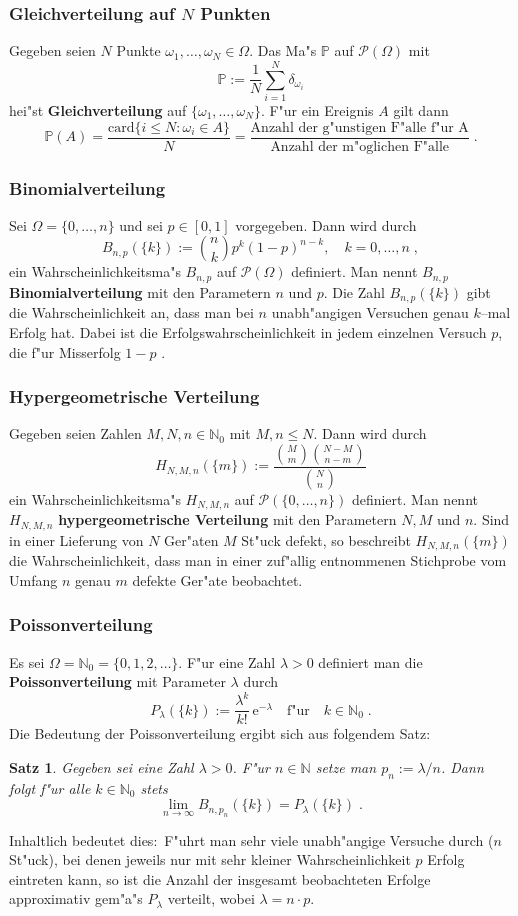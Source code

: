 \documentclass[ngerman,draft,parskip=half,twoside]{scrartcl}
\newtheorem{thm}{Satz}[section]
\newcommand*{\N}{\mathbb{N}}      %
\newcommand*{\PotM}{\mathcal{P}}    %
\newcommand*{\WKM}{\mathbb{P}}      %
\begin{document}
\subsubsection{Gleichverteilung auf $N$ Punkten}
Gegeben seien $N$ Punkte $\omega_1,\ldots,\omega_N\in\Omega$.
Das Ma"s $\WKM$ auf $\PotM(\Omega)$ mit
$$
\WKM:=\frac{1}{N}\sum_{i=1}^N \delta_{\omega_i}
$$
hei"st \textbf{Gleichverteilung} auf $\{\omega_1,\ldots,\omega_N\}$. F"ur ein Ereignis $A$ gilt dann
$$
\WKM(A)=\frac{\mathrm{card}\{ i\le N : \omega_i\in A\}}{N}=
\frac{\mbox{Anzahl der g"unstigen F"alle f"ur A}}{\mbox{Anzahl der m"oglichen F"alle}}\;.
$$
\subsubsection{Binomialverteilung}
Sei $\Omega=\{0,\ldots,n\}$ und sei $p\in[0,1]$ vorgegeben. Dann wird durch
$$
B_{n,p}(\{k\}):={n\choose k} p^k(1-p)^{n-k},\quad k=0,\ldots,n\;,
$$
ein Wahrscheinlichkeitsma"s $B_{n,p}$ auf $\PotM(\Omega)$ definiert. Man nennt $B_{n,p}$
\textbf{Binomialverteilung} mit den Parametern $n$ und $p$. Die Zahl
$B_{n,p}(\{k\})$ gibt die Wahrscheinlichkeit an, dass man bei $n$ unabh"angigen Versuchen genau $k$--mal
Erfolg hat. Dabei ist die Erfolgswahrscheinlichkeit in jedem einzelnen Versuch $p$, die f"ur
Misserfolg $1-p$ .
\subsubsection{Hypergeometrische Verteilung}
Gegeben seien Zahlen $M,N,n\in\N_0$ mit $M,n\le N$. Dann wird durch
$$
H_{N, M ,n}(\{m\}) :=\frac{{M\choose m}{N-M\choose n-m}}{{N\choose n}}
$$
ein Wahrscheinlichkeitsma"s $H_{N,M,n}$ auf $\PotM(\{0,\ldots,n\})$
definiert. Man nennt $H_{N,M,n}$  \textbf{hypergeometrische Verteilung} mit den Parametern $N,M$ und $n$.
Sind in einer Lieferung von $N$ Ger"aten $M$ St"uck defekt, so beschreibt $H_{N,M,n}(\{m\})$
die Wahrscheinlichkeit, dass man in einer zuf"allig entnommenen Stichprobe vom Umfang $n$ genau
$m$ defekte Ger"ate beobachtet.
\subsubsection{Poissonverteilung}
Es sei $\Omega=\N_0=\{0,1,2,\ldots\}$. F"ur eine Zahl $\lambda>0$ definiert
man die \textbf{Poissonverteilung} mit Parameter $\lambda$ durch
$$
P_\lambda(\{k\}):= \frac{\lambda^k}{k !}\,\mathrm e^{-\lambda}\quad\mbox{f"ur}\quad k\in\N_0\;.
$$
Die Bedeutung der Poissonverteilung ergibt sich aus folgendem Satz$\colon$
\begin{thm}
Gegeben sei eine Zahl $\lambda>0$. F"ur $n\in\N$ setze man
$p_n:=\lambda/n$. Dann folgt f"ur alle $k\in\N_0$
stets
$$
\lim_{n\to\infty} B_{n,p_n}(\{k\})= P_\lambda(\{k\})\;.
$$
\end{thm}
Inhaltlich bedeutet dies$\colon$ F"uhrt man sehr viele unabh"angige Versuche durch ($n$ St"uck), bei denen jeweils
nur mit sehr kleiner
Wahrscheinlichkeit $p$ Erfolg eintreten kann, so ist die Anzahl der insgesamt beobachteten Erfolge
approximativ gem"a"s $P_\lambda$ verteilt, wobei $\lambda= n\cdot p$.
\end{document}

